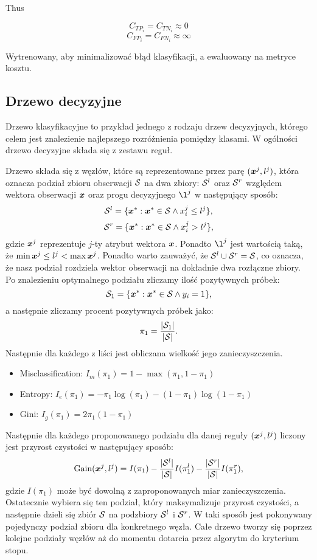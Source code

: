 \documentclass{book}
\begin{document}
	Thus
	
	$$ C_{TP_i} = C_{TN_i} \approx 0 $$
	$$ C_{FP_i} = C_{FN_i} \approx \infty $$

	Wytrenowany, aby minimalizować błąd klasyfikacji, a ewaluowany na metryce kosztu.

\subsection{Drzewo decyzyjne}
\label{drzewo}

	Drzewo klasyfikacyjne to przykład jednego z rodzaju drzew decyzyjnych, którego celem jest znalezienie najlepszego rozróżnienia pomiędzy klasami. W ogólności drzewo decyzyjne składa się z zestawu reguł.
	
	Drzewo składa się z węzłów, które są reprezentowane przez parę $(\boldsymbol{x}^j, l^j)$, która oznacza podział zbioru obserwacji $\mathcal{S}$ na dwa zbiory: $\mathcal{S}^{l}$ oraz $\mathcal{S}^{r}$ względem wektora obserwacji $\boldsymbol{x}$ oraz progu decyzyjnego $\l^j$ w następujący sposób:
	$$ \mathcal{S}^l = \{ \boldsymbol{x}^* : \boldsymbol{x}^* \in \mathcal{S} \land x^j_i \leq l^j \} \text{,} $$
	$$ \mathcal{S}^r = \{ \boldsymbol{x}^* : \boldsymbol{x}^* \in \mathcal{S} \land x^j_i > l^j \} \text{,} $$
	gdzie $\boldsymbol{x}^j$ reprezentuje $j$-ty atrybut wektora $\boldsymbol{x}$. Ponadto $\l^j$ jest wartością taką, że $\min{\boldsymbol{x}^j} \leq l^j < \max{\boldsymbol{x}^j}$. Ponadto warto zauważyć, że $\mathcal{S}^l \cup \mathcal{S}^r = \mathcal{S}$, co oznacza, że nasz podział rozdziela wektor obserwacji na dokładnie dwa rozłączne zbiory.
	Po znalezieniu optymalnego podziału zliczamy ilość pozytywnych próbek:
	$$ \mathcal{S}_1  = \{ \boldsymbol{x}^* : \boldsymbol{x}^* \in \mathcal{S} \land y_i = 1 \} \text{,} $$
	a następnie zliczamy procent pozytywnych próbek jako:
	$$ \pi_1 = \frac{|\mathcal{S}_1|}{|\mathcal{S}|} \text{.}$$
	Następnie dla każdego z liści jest obliczana wielkość jego zanieczyszczenia.
	\begin{itemize}
		\item Misclassification: $I_m(\pi_1) = 1 - \max(\pi_1, 1 - \pi_1)$
		\item Entropy: $I_e(\pi_1) = -\pi_1 \log(\pi_1) - (1 - \pi_1) \log (1 - \pi_1)$
		\item Gini: $I_g(\pi_1) = 2 \pi_1 (1 - \pi_1)$
	\end{itemize}{}
	Następnie dla każdego proponowanego podziału dla danej reguły $(\boldsymbol{x}^j, l^j)$ liczony jest przyrost czystości w następujący sposób:
	$$ \text{Gain}(\boldsymbol{x}^j, l^j) = I(\pi_1) - \frac{|\mathcal{S}^l|}{|\mathcal{S}|} I(\pi_1^l) - \frac{|\mathcal{S}^r|}{|\mathcal{S}|} I(\pi_1^r) \text{,}$$
	gdzie $I(\pi_1)$ może być dowolną z zaproponowanych miar zanieczyszczenia.
	Ostatecznie wybiera się ten podział, który maksymalizuje przyrost czystości, a następnie dzieli się zbiór $\mathcal{S}$ na podzbiory $\mathcal{S}^l$ i $\mathcal{S}^r$.
	W taki sposób jest pokonywany pojedynczy podział zbioru dla konkretnego węzła. Całe drzewo tworzy się poprzez kolejne podziały węzłów aż do momentu dotarcia przez algorytm do kryterium stopu.
	
\end{document}
